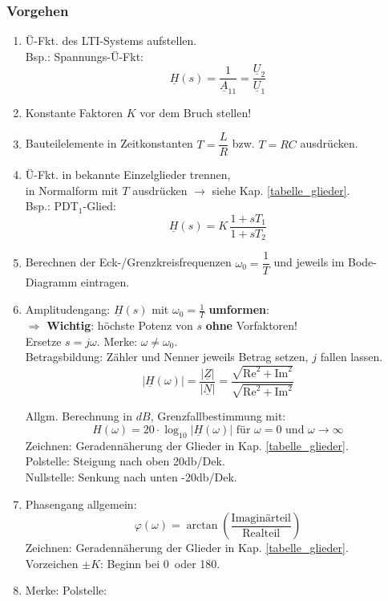  \subsubsection{Vorgehen}
 \begin{enumerate}
 	\item Ü-Fkt. des LTI-Systems aufstellen.\\
 	Bsp.: Spannungs-Ü-Fkt: $$\underline{H}(s)=\frac{1}{\underline{A}_{11}} = \frac{\underline{U}_2}{\underline{U}_1}$$
 	
 	\item Konstante Faktoren $K$ vor dem Bruch stellen!
 	\item Bauteilelemente in Zeitkonstanten $T=\dfrac{L}{R}$ bzw. $T=RC$ ausdrücken.
 	\item Ü-Fkt. in bekannte Einzelglieder trennen, \\in Normalform mit $T$ ausdrücken $\rightarrow$ siehe Kap. \ref{tabelle_glieder}.\\
 	Bsp.: PDT$_1$-Glied: $$\underline{H}(s)=K\,\frac{1+sT_1}{1+sT_2}$$
 	\item Berechnen der Eck-/Grenzkreisfrequenzen $\omega_0 = \dfrac{1}{T}$ und jeweils im Bode-Diagramm eintragen.
 	\item Amplitudengang:
 	$\underline{H}(s)$ mit $\omega_0=\frac{1}{T}$ \textbf{umformen}:\\ $\Rightarrow$ \textbf{Wichtig}: höchste Potenz von $s$ \textbf{ohne} Vorfaktoren!\\
 	Ersetze $s=j\omega$. \quad Merke:  $\omega\neq\omega_0$.\\
 	
  	Betragsbildung: Zähler und Nenner jeweils Betrag setzen, $j$ fallen lassen.
 	$$ |\underline{H}(\omega)| = \frac{|\underline{Z}|}{|\underline{N}|} = \frac{\sqrt{\text{Re}^2+\text{Im}^2}}{\sqrt{\text{Re}^2+\text{Im}^2}} $$
 	
 	Allgm. Berechnung in $dB$, Grenzfallbestimmung mit: 
 	$$H(\omega) = 20\cdot\log_{10}|\underline{H}(\omega)| \text{ für }\omega=0 \text{ und } \omega \rightarrow \infty $$
 	Zeichnen: Geradennäherung der Glieder in Kap. \ref{tabelle_glieder}.\\
 	Polstelle: Steigung nach oben 20db/Dek.\\
 	Nullstelle: Senkung nach unten -20db/Dek.
 	
 	\item Phasengang allgemein:
 	$$\varphi(\omega) = \arctan \left( \frac{\text{Imaginärteil}}{\text{Realteil}} \right)$$
 	Zeichnen: Geradennäherung der Glieder in Kap. \ref{tabelle_glieder}.\\
 	Vorzeichen $\pm K$: Beginn bei 0\textdegree \, oder 180\textdegree.
 	
 	\item Merke: Polstelle: 
 \end{enumerate}
